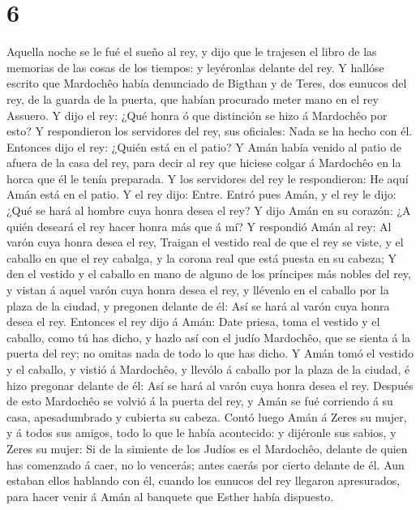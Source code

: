 \hypertarget{section-5}{%
\section{6}\label{section-5}}

 Aquella noche se le fué el sueño al rey, y dijo que le
trajesen el libro de las memorias de las cosas de los tiempos: y
leyéronlas delante del rey.  Y hallóse escrito que
Mardochêo había denunciado de Bigthan y de Teres, dos eunucos del rey,
de la guarda de la puerta, que habían procurado meter mano en el rey
Assuero.  Y dijo el rey: ¿Qué honra ó que distinción se
hizo á Mardochêo por esto? Y respondieron los servidores del rey, sus
oficiales: Nada se ha hecho con él.  Entonces dijo el rey:
¿Quién está en el patio? Y Amán había venido al patio de afuera de la
casa del rey, para decir al rey que hiciese colgar á Mardochêo en la
horca que él le tenía preparada.  Y los servidores del rey
le respondieron: He aquí Amán está en el patio. Y el rey dijo: Entre.
 Entró pues Amán, y el rey le dijo: ¿Qué se hará al hombre
cuya honra desea el rey? Y dijo Amán en su corazón: ¿A quién deseará el
rey hacer honra más que á mí?  Y respondió Amán al rey: Al
varón cuya honra desea el rey,  Traigan el vestido real de
que el rey se viste, y el caballo en que el rey cabalga, y la corona
real que está puesta en su cabeza;  Y den el vestido y el
caballo en mano de alguno de los príncipes más nobles del rey, y vistan
á aquel varón cuya honra desea el rey, y llévenlo en el caballo por la
plaza de la ciudad, y pregonen delante de él: Así se hará al varón cuya
honra desea el rey.  Entonces el rey dijo á Amán: Date
priesa, toma el vestido y el caballo, como tú has dicho, y hazlo así con
el judío Mardochêo, que se sienta á la puerta del rey; no omitas nada de
todo lo que has dicho.  Y Amán tomó el vestido y el
caballo, y vistió á Mardochêo, y llevólo á caballo por la plaza de la
ciudad, é hizo pregonar delante de él: Así se hará al varón cuya honra
desea el rey.  Después de esto Mardochêo se volvió á la
puerta del rey, y Amán se fué corriendo á su casa, apesadumbrado y
cubierta su cabeza.  Contó luego Amán á Zeres su mujer, y
á todos sus amigos, todo lo que le había acontecido: y dijéronle sus
sabios, y Zeres su mujer: Si de la simiente de los Judíos es el
Mardochêo, delante de quien has comenzado á caer, no lo vencerás; antes
caerás por cierto delante de él.  Aun estaban ellos
hablando con él, cuando los eunucos del rey llegaron apresurados, para
hacer venir á Amán al banquete que Esther había dispuesto.


